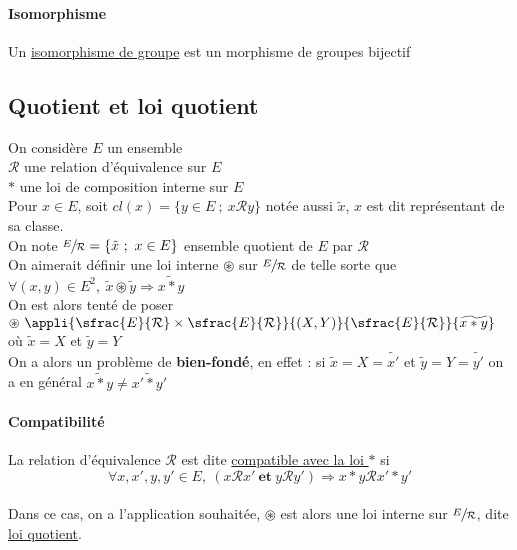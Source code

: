 		\paragraph{Isomorphisme}
			Un \uline{isomorphisme de groupe} est un morphisme de groupes bijectif \trait
	\subsection{Quotient et loi quotient}
		On considère $E$ un ensemble \\ $\mathcal{R}$ une relation d'équivalence sur $E$ \\$\ast$ une loi de composition interne sur $E$\vspace*{0.2cm} \\
		Pour $x\in E$, soit $cl(x)=\{y\in E ~;~ x\mathcal{R} y\}$ notée aussi $\tilde{x}$, $x$ est dit représentant de sa classe.\\
		On note $\sfrac{E}{\mathcal{R}} = \{ \tilde{x} ~;~x\in E\}$ ensemble quotient de $E$ par $\mathcal{R}$ \vspace*{0.3cm} \\
		On aimerait définir une loi interne $\circledast$ sur $\sfrac{E}{\mathcal{R}}$ de telle sorte que $\forall (x,y)\in E^2 ,~ \tilde{x}\circledast\tilde{y} \Rightarrow \widetilde{x\ast y}$\\
		On est alors tenté de poser $\circledast ~\appli{ \sfrac{E}{\mathcal{R}}\times\sfrac{E}{\mathcal{R}}}{(X,Y)}{\sfrac{E}{\mathcal{R}}}{\widetilde{x\ast y}}$ où $\tilde{x} = X$ et $\tilde{y}=Y$\\
		On a alors un problème de \textbf{bien-fondé}, en effet : si $\tilde{x} =X=\tilde{x'}$ et $\tilde{y}=Y=\tilde{y'}$ on a en général $\widetilde{x\ast y}\neq \widetilde{x'\ast y'}$ \\ \traitd
		\paragraph{Compatibilité}
			La relation d'équivalence $\mathcal{R}$ est dite \uline{compatible avec la loi $\ast$} si 
			\[ \forall x,x',y,y' \in E ,~(x\mathcal{R} x' ~\mathbf{et}~y\mathcal{R} y') \Rightarrow x\ast y \mathcal{R} x'\ast y' \] \trait
		\vspace*{-1.1cm} \\ 
		Dans ce cas, on a l'application souhaitée, $\circledast$ est alors une loi interne sur $\sfrac{E}{\mathcal{R}}$, dite \uline{loi quotient}.\\
